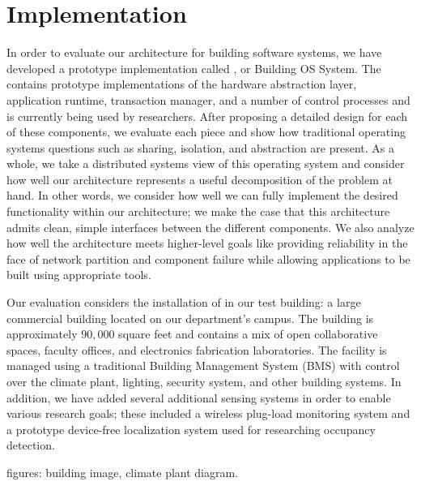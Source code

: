 
\section{Implementation}

In order to evaluate our architecture for building software systems, we have developed a prototype implementation called \implname, or Building OS System.  The \implname contains prototype implementations of the hardware abstraction layer, application runtime, transaction manager, and a number of control processes and is currently being used by researchers.  After proposing a detailed design for each of these components, we evaluate each piece and show how traditional operating systems questions such as sharing, isolation, and abstraction are present.  As a whole, we take a distributed systems view of this operating system and consider how well our architecture represents a useful decomposition of the problem at hand.  In other words, we consider how well we can fully implement the desired functionality within our architecture; we make the case that this architecture admits clean, simple interfaces between the different components.  We also analyze how well the architecture meets higher-level goals like providing reliability in the face of network partition and component failure while allowing applications to be built using appropriate tools.

Our evaluation considers the installation of \implname in our test building: a large commercial building located on our department's campus.  The building is approximately $90,000$ square feet and contains a mix of open collaborative spaces, faculty offices, and electronics fabrication laboratories.  The facility is managed using a traditional Building Management System (BMS) with control over the climate plant, lighting, security system, and other building systems.  In addition, we have added several additional sensing systems in order to enable various research goals; these included a wireless plug-load monitoring system and a prototype device-free localization system used for researching occupancy detection.

figures: building image, climate plant diagram.

